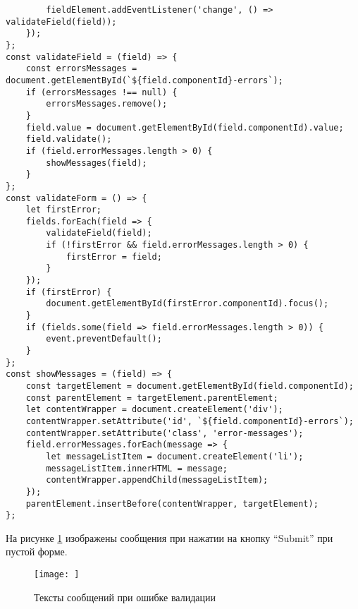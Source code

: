 \documentclass[a4paper,14pt]{extarticle}
\begin{document}
\begin{lstlisting}
        fieldElement.addEventListener('change', () => validateField(field));
    });
};
const validateField = (field) => {
    const errorsMessages = document.getElementById(`${field.componentId}-errors`);
    if (errorsMessages !== null) {
        errorsMessages.remove();
    }
    field.value = document.getElementById(field.componentId).value;
    field.validate();
    if (field.errorMessages.length > 0) {
        showMessages(field);
    }
};
const validateForm = () => {
    let firstError;
    fields.forEach(field => {
        validateField(field);
        if (!firstError && field.errorMessages.length > 0) {
            firstError = field;
        }
    });
    if (firstError) {
        document.getElementById(firstError.componentId).focus();
    }
    if (fields.some(field => field.errorMessages.length > 0)) {
        event.preventDefault();
    }
};
const showMessages = (field) => {
    const targetElement = document.getElementById(field.componentId);
    const parentElement = targetElement.parentElement;
    let contentWrapper = document.createElement('div');
    contentWrapper.setAttribute('id', `${field.componentId}-errors`);
    contentWrapper.setAttribute('class', 'error-messages');
    field.errorMessages.forEach(message => {
        let messageListItem = document.createElement('li');
        messageListItem.innerHTML = message;
        contentWrapper.appendChild(messageListItem);
    });
    parentElement.insertBefore(contentWrapper, targetElement);
};
\end{lstlisting}

На рисунке \ref{fig:contact-validation} изображены сообщения
при нажатии на кнопку \enquote{Submit} при пустой форме.
\begin{figure}[H]
    \centering
    \texttt{[image: ]}
    \caption{Тексты сообщений при ошибке валидации}
    \label{fig:contact-validation}
\end{figure}
\end{document}
